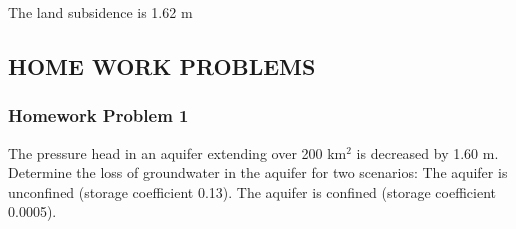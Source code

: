 \documentclass[letterpaper,10pt,english]{sphinxmanual}
\begin{document}
\begin{sphinxVerbatim}[commandchars=\\\{\}]
     
   
   
   
   

  

 
\end{sphinxVerbatim}

\begin{sphinxVerbatim}[commandchars=\\\{\}]
The land subsidence is 1.62 m
\end{sphinxVerbatim}


\subsection{HOME WORK PROBLEMS}
\label{\detokenize{contents/tutorials/tutorial_02/tutorial_02:home-work-problems}}

\subsubsection{Homework Problem 1}
\label{\detokenize{contents/tutorials/tutorial_02/tutorial_02:homework-problem-1}}
The pressure head in an aquifer extending over 200 km\(^2\) is decreased by 1.60 m.
Determine the loss of groundwater in the aquifer for two scenarios:
The aquifer is unconfined (storage coefficient 0.13).
The aquifer is confined (storage coefficient 0.0005).
\end{document}
